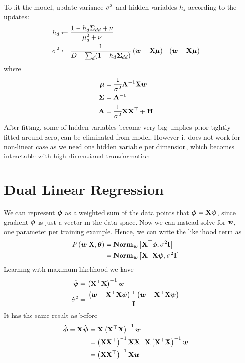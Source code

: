 To fit the model, update variance $\sigma^2$ and hidden variables $h_d$ according to the updates:
\begin{align*}
	h_d&\gets\frac{1-h_d\mathbf{\Sigma}_{dd}+\nu}{\mu_d^2+\nu} \\
	\sigma^2&\gets\frac{1}{D-\sum_d(1-h_d\mathbf{\Sigma}_{dd})}\left(\boldsymbol{w}-\mathbf{X}\boldsymbol{\mu}\right){}^\top\left(\boldsymbol{w}-\mathbf{X}\boldsymbol{\mu}\right)
\end{align*}
where
\begin{align*}
	\boldsymbol{\mu}&=\frac{1}{\sigma^2}\mathbf{A}^{-1}\mathbf{X}\boldsymbol{w} \\
	\mathbf{\Sigma}&=\mathbf{A}^{-1} \\
	\mathbf{A}&=\frac{1}{\sigma^2}\mathbf{X}\mathbf{X}^\top+\mathbf{H}
\end{align*}
After fitting, some of hidden variables become very big, implies prior tightly fitted around zero, can be eliminated from model. However it does not work for non-linear case as we need one hidden variable per dimension, which becomes intractable with high dimensional transformation.

\section{Dual Linear Regression}

We can represent $\boldsymbol{\phi}$ as a weighted sum of the data points that $\boldsymbol{\phi}=\mathbf{X}\boldsymbol{\psi}$, since gradient $\boldsymbol{\phi}$ is just a vector in the data space. Now we can instead solve for $\boldsymbol{\psi}$, one parameter per training example. Hence, we can write the likelihood term as
\begin{align*}
	P\left(\boldsymbol{w}|\mathbf{X},\boldsymbol{\theta}\right)&=\mathbf{Norm}_{\boldsymbol{w}}\left[\mathbf{X}{}^\top\boldsymbol{\phi},\sigma^2\mathbf{I}\right] \\
	&=\mathbf{Norm}_{\boldsymbol{w}}\left[\mathbf{X}{}^\top\mathbf{X}\boldsymbol{\psi},\sigma^2\mathbf{I}\right]
\end{align*}
Learning with maximum likelihood we have
\begin{align*}
	\hat{\boldsymbol{\psi}}&=\left(\mathbf{X}^\top\mathbf{X}\right)^{-1}\boldsymbol{w} \\
	\hat{\sigma}^2&=\frac{\left(\boldsymbol{w}-\mathbf{X}^\top\mathbf{X}\boldsymbol{\psi}\right){}^\top\left(\boldsymbol{w}-\mathbf{X}^\top\mathbf{X}\boldsymbol{\psi}\right)}{\mathbf{I}}
\end{align*}
It has the same result as before
\begin{align*}
	\hat{\boldsymbol{\phi}}=\mathbf{X}\hat{\boldsymbol{\psi}}&=\mathbf{X}\left(\mathbf{X}^\top\mathbf{X}\right)^{-1}\boldsymbol{w} \\
	&=\left(\mathbf{X}\mathbf{X}^\top\right)^{-1}\mathbf{X}\mathbf{X}^\top\mathbf{X}\left(\mathbf{X}^\top\mathbf{X}\right)^{-1}\boldsymbol{w} \\
	&=\left(\mathbf{X}\mathbf{X}^\top\right)^{-1}\mathbf{X}\boldsymbol{w}
\end{align*}

